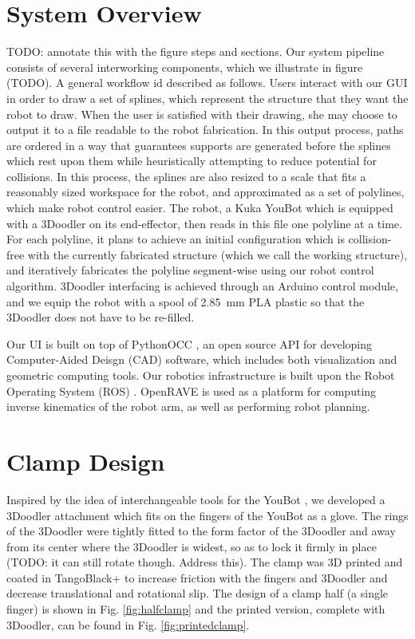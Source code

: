 \documentclass[conference]{acmsiggraph}
\begin{document}
\section{System Overview}
TODO: annotate this with the figure steps and sections.
Our system pipeline consists of several interworking components, which we illustrate in figure (TODO).  A general workflow id described as follows.  Users interact with our GUI in order to draw a set of splines, which represent the structure that they want the robot to draw.  When the user is satisfied with their drawing, she may choose to output it to a file readable to the robot fabrication.  In this output process, paths are ordered in a way that guarantees supports are generated before the splines which rest upon them while heuristically attempting to reduce potential for collisions.  In this process, the splines are also resized to a scale that fits a reasonably sized workspace for the robot, and approximated as a set of polylines, which make robot control easier.  The robot, a Kuka YouBot which is equipped with a 3Doodler on its end-effector, then reads in this file one polyline at a time.  For each polyline, it plans to achieve an initial configuration which is collision-free with the currently fabricated structure (which we call the working structure), and iteratively fabricates the polyline segment-wise using our robot control algorithm.  3Doodler interfacing is achieved through an Arduino control module, and we equip the robot with a spool of 2.85~mm PLA plastic so that the 3Doodler does not have to be re-filled.

Our UI is built on top of PythonOCC \cite{PythonOCC}, an open source API for developing Computer-Aided Deisgn (CAD) software, which includes both visualization and geometric computing tools.  Our robotics infrastructure is built upon the Robot Operating System (ROS) \cite{ROS}.  OpenRAVE \cite{OpenRAVE} is used as a platform for computing inverse kinematics of the robot arm, as well as performing robot planning.




\section{Clamp Design}
Inspired by the idea of interchangeable tools for the YouBot \cite{Knepper13}, we developed a 3Doodler attachment which fits on the fingers of the YouBot as a glove.  The rings of the 3Doodler were tightly fitted to the form factor of the 3Doodler and away from its center where the 3Doodler is widest, so as to lock it firmly in place (TODO: it can still rotate though.  Address this). The clamp was 3D printed and coated in TangoBlack+ \cite{TangoBlack} to increase friction with the fingers and 3Doodler and decrease translational and rotational slip.  The design of a clamp half (a single finger) is shown in Fig. \ref{fig:halfclamp} and the printed version, complete with 3Doodler, can be found in Fig. \ref{fig:printedclamp}.  
\end{document}
